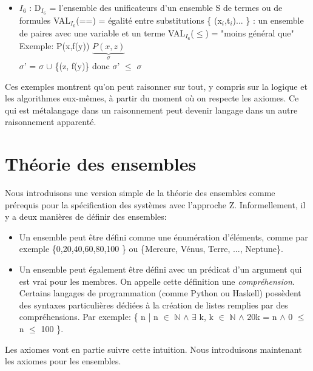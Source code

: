 {\begin{itemize}
\item \underline{$I_{6}$} : D$_{I_{6}}$ = l'ensemble des unificateurs d'un ensemble S de termes ou de formules
VAL$_{I_{6}}$(==) = égalité entre substitutions \{ (x$_{i}$,t$_{i}$)... \} : un ensemble de paires avec une variable et un terme VAL$_{I_{6}}$($\leq$) = "moins général que"\\
\newline
Exemple: P(x,f(y)) \hspace{1cm} $\underbrace{P(x,z)}_{\sigma}$\\
$\sigma$' = $\sigma$ $\cup$ \{(z, f(y)\} donc 
$\sigma$' $\leq$ $\sigma$\\
\end{itemize}
Ces exemples montrent qu'on peut raisonner sur tout, y compris sur la logique et les algorithmes eux-mêmes,
à partir du moment où on respecte les axiomes.
Ce qui est métalangage dans un raisonnement peut devenir langage dans un autre raisonnement apparenté.



\section{Théorie des ensembles}

Nous introduisons une version simple de la théorie des ensembles
comme prérequis pour la spécification des systèmes avec l'approche Z.
Informellement, il y a deux manières de définir des ensembles:
\begin{itemize}
\item Un ensemble peut être défini comme une énumération d'éléments, comme par exemple
\{0,20,40,60,80,100 \} ou \{Mercure, Vénus, Terre, ..., Neptune\}.
\item Un ensemble peut également être défini avec un prédicat d'un argument qui est vrai pour les membres.
On appelle cette définition une {\em compréhension}.
Certains langages de programmation (comme Python ou Haskell) possèdent des syntaxes particulières dédiées
à la création de listes remplies par des compréhensions.
Par exemple: \{ n | n $\in$ $\mathbb{N}$ $\wedge$ $\exists$ k, k $\in$ $\mathbb{N}$ $\wedge$ 20k = n $\wedge$ 0 $\leq$ n $\leq$ 100 \}.
\end{itemize}
Les axiomes vont en partie suivre cette intuition.
Nous introduisons maintenant les axiomes pour les ensembles.

}
